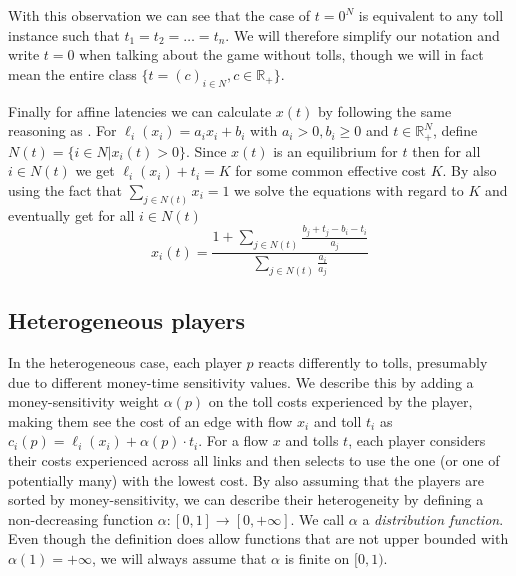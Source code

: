 \documentclass[10pt,a4paper]{book}
\newcommand{\R}{\mathbb{R}}
\theoremstyle{definition}
\theoremstyle{comment}
\begin{document}
With this observation we can see that the case of $t = 0^N$ is equivalent to any toll instance such that $t_1 = t_2 = \dots = t_n$.
We will therefore simplify our notation and write $t = 0$ when talking about the game without tolls, though we will in fact mean the entire class $\{t = (c)_{i \in N}, c \in \R_+\}$.

Finally for affine latencies we can calculate $x(t)$ by following the same reasoning as \cite[Prop $3.1$]{Harks_2019}.
For $\ell_i(x_i) = a_i x_i + b_i$ with $a_i > 0, b_i \geq 0$ and $t \in \R_+^N$, define $N(t) = \{i \in N | x_i(t) > 0\}$.
Since $x(t)$ is an equilibrium for $t$ then for all $i \in N(t)$ we get $\ell_i(x_i) + t_i = K$ for some common effective cost $K$.
By also using the fact that $\sum_{j \in N(t)} x_i = 1$ we solve the equations with regard to $K$ and eventually get for all $i \in N(t)$
\begin{equation}
	\label{eq:homogeneous_x_i}
	x_i(t) = \frac{1 + \sum_{j \in N(t)}\frac{b_j + t_j - b_i - t_i}{a_j}}{\sum_{j \in N(t)}\frac{a_i}{a_j}}
\end{equation}

\subsection*{Heterogeneous players}

In the heterogeneous case, each player $p$ reacts differently to tolls, presumably due to different money-time sensitivity values.
We describe this by adding a money-sensitivity weight $\alpha(p)$ on the toll costs experienced by the player, making them see the cost of an edge with flow $x_i$ and toll $t_i$ as $c_i(p) = \ell_i(x_i) + \alpha(p) \cdot t_i$.
For a flow $x$ and tolls $t$, each player considers their costs experienced across all links and then selects to use the one (or one of potentially many) with the lowest cost. 
By also assuming that the players are sorted by money-sensitivity, we can describe their heterogeneity by defining a non-decreasing function $\alpha: [0, 1] \rightarrow [0, +\infty]$.
We call $\alpha$ a \textit{distribution function}.
Even though the definition does allow functions that are not upper bounded with $\alpha(1) = +\infty$, we will always assume that $\alpha$ is finite on $[0, 1)$.
\end{document}
